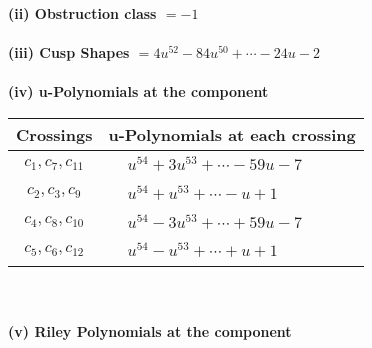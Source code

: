 \documentclass[1p]{elsarticle_modified}
\theoremstyle{definition}
\begin{document}
\flushleft \textbf{(ii) Obstruction class $= -1$}\\~\\
\flushleft \textbf{(iii) Cusp Shapes $= 4 u^{52}-84 u^{50}+\cdots-24 u-2$}\\~\\
\newpage\renewcommand{\arraystretch}{1}
\flushleft \textbf{(iv) u-Polynomials at the component}\newline \\
\begin{tabular}{m{50pt}|m{274pt}}
Crossings & \hspace{64pt}u-Polynomials at each crossing \\
\hline $$\begin{aligned}c_{1},c_{7},c_{11}\end{aligned}$$&$\begin{aligned}
&u^{54}+3 u^{53}+\cdots-59 u-7
\end{aligned}$\\
\hline $$\begin{aligned}c_{2},c_{3},c_{9}\end{aligned}$$&$\begin{aligned}
&u^{54}+u^{53}+\cdots- u+1
\end{aligned}$\\
\hline $$\begin{aligned}c_{4},c_{8},c_{10}\end{aligned}$$&$\begin{aligned}
&u^{54}-3 u^{53}+\cdots+59 u-7
\end{aligned}$\\
\hline $$\begin{aligned}c_{5},c_{6},c_{12}\end{aligned}$$&$\begin{aligned}
&u^{54}- u^{53}+\cdots+u+1
\end{aligned}$\\
\hline
\end{tabular}\\~\\
\newpage\renewcommand{\arraystretch}{1}
\flushleft \textbf{(v) Riley Polynomials at the component}\newline \\
\end{document}
